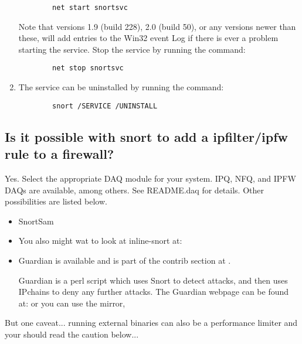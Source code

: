 \documentclass{article}
\begin{document}
\begin{enumerate}
\begin{verbatim}
        net start snortsvc
	\end{verbatim}
    Note that versions 1.9 (build 228), 2.0 (build 50), or any versions newer
    than these, will add entries to the Win32 event Log if there is ever a
    problem starting the service.
    Stop the service by running the command:
    \begin{verbatim}
        net stop snortsvc
    \end{verbatim}
\item  The service can be uninstalled by running the command:
	\begin{verbatim}
        snort /SERVICE /UNINSTALL
	\end{verbatim}
\end{enumerate}

\subsection{Is it possible with snort to add a ipfilter/ipfw rule to a firewall? }

Yes.  Select the appropriate DAQ module for your system.  IPQ, NFQ, and IPFW
DAQs are available, among others.  See README.daq for details.  Other
possibilities are listed below.

\begin{itemize}
\item SnortSam

\item You also might wat to look at inline-snort at:
\item Guardian is available and is part of the contrib section at .

Guardian is a perl script which uses Snort to detect attacks,
and then uses IPchains to deny any further attacks. The Guardian webpage can be found at:
or you can use the mirror,

\end{itemize}
But one caveat... running external binaries can also be a performance
limiter and your should read the caution below...
\end{document}

